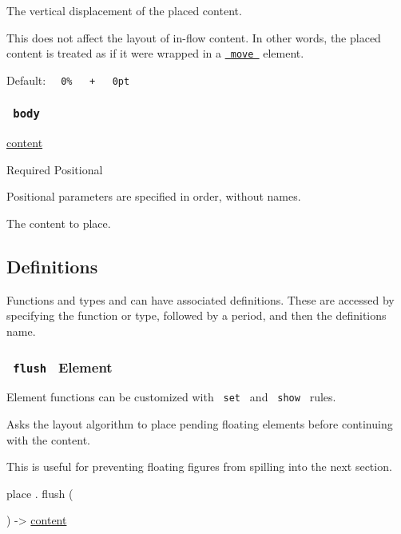 The vertical displacement of the placed content.

This does not affect the layout of in-flow content. In other words, the
placed content is treated as if it were wrapped in a
\href{/docs/reference/layout/move/}{\texttt{\ move\ }} element.

Default:
\texttt{\ }{\texttt{\ 0\%\ }}\texttt{\ }{\texttt{\ +\ }}\texttt{\ }{\texttt{\ 0pt\ }}\texttt{\ }

\subsubsection{\texorpdfstring{\texttt{\ body\ }}{ body }}\label{parameters-body}

\href{/docs/reference/foundations/content/}{content}

{Required} {{ Positional }}

\label{parameters-body-positional-tooltip}
Positional parameters are specified in order, without names.

The content to place.

\subsection{\texorpdfstring{{ Definitions
}}{ Definitions }}\label{definitions}

\label{definitions-tooltip}
Functions and types and can have associated definitions. These are
accessed by specifying the function or type, followed by a period, and
then the definition\textquotesingle s name.

\subsubsection{\texorpdfstring{\texttt{\ flush\ } {{ Element
}}}{ flush   Element }}\label{definitions-flush}

\label{definitions-flush-element-tooltip}
Element functions can be customized with \texttt{\ set\ } and
\texttt{\ show\ } rules.

Asks the layout algorithm to place pending floating elements before
continuing with the content.

This is useful for preventing floating figures from spilling into the
next section.

place { . } { flush } (

) -\textgreater{} \href{/docs/reference/foundations/content/}{content}

